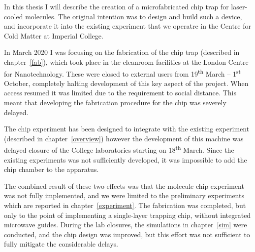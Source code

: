 In this thesis I will describe the creation of a microfabricated chip trap for
laser-cooled \CaF{} molecules. The original intention was to design and build
such a device, and incorporate it into the existing \CaF{} experiment that we
operatre in the Centre for Cold Matter at Imperial College.

In March 2020 I was focusing on the fabrication of the
chip trap (described in chapter~\ref{fab}), which took place in the cleanroom
facilities at the London Centre for Nanotechnology. These were closed to
external users from 19\textsuperscript{th} March -- 1\textsuperscript{st}
October, completely halting development of this key aspect of the project. When
access resumed it was limited due to the requirement to social distance. This
meant that developing the fabrication procedure for the chip was severely
delayed.

The chip experiment has been designed to integrate with the existing \CaF
experiment (described in chapter~\ref{overview}) however the development of
this machine was delayed closure of the College laboratories starting on
18\textsuperscript{th} March. Since the existing experiments was not
sufficiently developed, it was impossible to add the chip chamber to the
apparatus. 

The combined result of these two effects was that the molecule chip experiment
was not fully implemented, and we were limited to the preliminary experiments
which are reported in chapter~\ref{experiment}. The fabrication was completed,
but only to the point of implementing a single-layer trapping chip, without
integrated microwave guides. During the lab closures, the simulations in
chapter~\ref{sim} were conducted, and the chip design was improved, but this
effort was not sufficient to fully mitigate the considerable delays.
